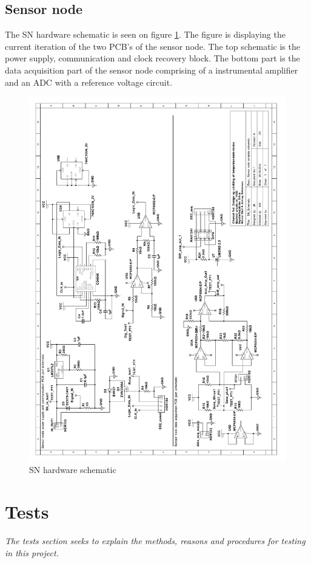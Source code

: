 \subsection{Sensor node}
The SN hardware schematic is seen on figure \ref{schematic:SN}. The figure is displaying the current iteration of the two PCB's of the sensor node. The top schematic is the power supply, communication and clock recovery block. The bottom part is the data acquisition part of the sensor node comprising of a instrumental amplifier and an ADC with a reference voltage circuit.
\begin{figure}[H]
	\centering
	\includegraphics[width=1.1\textwidth]{billeder/11projectdescription/SN_schematic_rotated}
	\caption{SN hardware schematic}
	\label{schematic:SN}
\end{figure}


\section{Tests}
\textit{The tests section seeks to explain the methods, reasons and procedures for testing in this project.}

